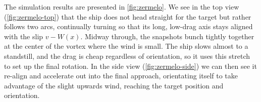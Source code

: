 The simulation results are presented in \cref{fig:zermelo}. We see in the top view (\cref{fig:zermelo-top}) that the ship does not head straight for the target but rather follows two arcs, continually turning so that its long, low-drag axis stays aligned with the slip $v - W(x)$. Midway through, the snapshots bunch tightly together at the center of the vortex where the wind is small. The ship slows almost to a standstill, and the drag is cheap regardless of orientation, so it uses this stretch to set up the final rotation. In the side view (\cref{fig:zermelo-side}) we can then see it re-align and accelerate out into the final approach, orientating itself to take advantage of the slight upwards wind, reaching the target position and orientation.
